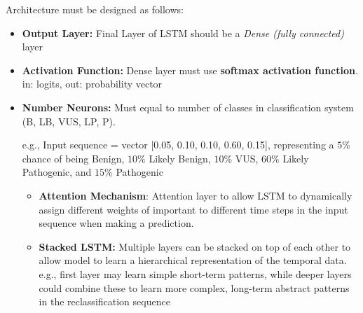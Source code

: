 \documentclass[../main.tex]{subfiles}
\begin{document}
Architecture must be designed as follows:
\begin{itemize}
    \item \textbf{Output Layer:} Final Layer of LSTM should be a \textit{Dense (fully connected)} layer
    \item \textbf{Activation Function:} Dense layer must use \textbf{softmax activation function}. in: logits, out: probability vector
    \item \textbf{Number Neurons:} Must equal to number of classes in classification system (B, LB, VUS, LP, P). 

    e.g., Input sequence = vector [0.05, 0.10, 0.10,
0.60, 0.15], representing a $5\%$ chance of being Benign, $10\%$ Likely Benign, $10\%$ VUS, $60\%$ Likely Pathogenic, and $15\%$ Pathogenic

\begin{itemize}
    \item \textbf{Attention Mechanism}: Attention layer to allow LSTM to dynamically assign different weights of important to different time steps in the input sequence when making a prediction.
    \item \textbf{Stacked LSTM:} Multiple layers can be stacked on top of each other to allow model to learn a hierarchical representation of the temporal data. e.g., first layer may learn simple short-term patterns, while deeper
layers could combine these to learn more complex, long-term abstract patterns in the reclassification sequence
\end{itemize}

\end{itemize}
\end{document}
